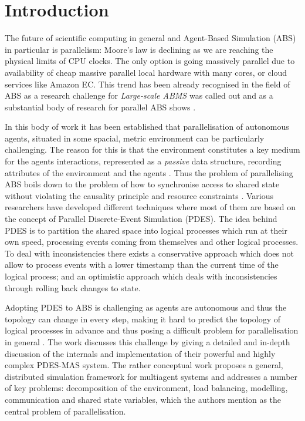 \section{Introduction} %
The future of scientific computing in general and Agent-Based Simulation (ABS) in particular is parallelism: Moore's law is declining as we are reaching the physical limits of CPU clocks. The only option is going massively parallel due to availability of cheap massive parallel local hardware with many cores, or cloud services like Amazon EC. This trend has been already recognised in the field of ABS as a research challenge for \textit{Large-scale ABMS} \cite{macal_everything_2016} was called out and as a substantial body of research for parallel ABS shows \cite{suryanarayanan_pdes-mas_2013, logan_distributed_2001, lees_using_2008, suryanarayanan_synchronised_2013, riley_next_2003, gasser_mace3j:_2002, himmelspach_plugn_2007, minson_distributing_2008, gorur_repast_2016, hay_experiments_2015, abar_agent_2017, cicirelli_efficient_2015}.

In this body of work it has been established that parallelisation of autonomous agents, situated in some spacial, metric environment can be particularly challenging. The reason for this is that the environment constitutes a key medium for the agents interactions, represented as a \textit{passive} data structure, recording attributes of the environment and the agents \cite{lees_using_2008}. Thus the problem of parallelising ABS boils down to the problem of how to synchronise access to shared state without violating the causality principle and resource constraints \cite{logan_distributed_2001, suryanarayanan_pdes-mas_2013}. Various researchers have developed different techniques where most of them are based on the concept of Parallel Discrete-Event Simulation (PDES). The idea behind PDES is to partition the shared space into logical processes which run at their own speed, processing events coming from themselves and other logical processes. To deal with inconsistencies there exists a conservative approach which does not allow to process events with a lower timestamp than the current time of the logical process; and an optimistic approach which deals with inconsistencies through rolling back changes to state.

Adopting PDES to ABS is challenging as agents are autonomous and thus the topology can change in every step, making it hard to predict the topology of logical processes in advance \cite{lees_using_2008} and thus posing a difficult problem for parallelisation in general \cite{cicirelli_efficient_2015}. The work \cite{suryanarayanan_pdes-mas_2013, suryanarayanan_synchronised_2013} discusses this challenge by giving a detailed and in-depth discussion of the internals and implementation of their powerful and highly complex PDES-MAS system. The rather conceptual work \cite{logan_distributed_2001} proposes a general, distributed simulation framework for multiagent systems and addresses a number of key problems: decomposition of the environment, load balancing, modelling, communication and shared state variables, which the authors mention as the central problem of parallelisation.


